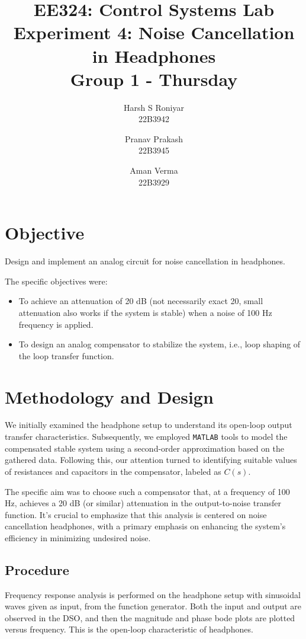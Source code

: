 \documentclass{article}
\title{EE324: Control Systems Lab \\ Experiment 4: Noise Cancellation in Headphones\\ \textbf{Group 1 - Thursday}}
\author{\large Harsh S Roniyar\\ \large 22B3942 \and \large Pranav Prakash\\ \large 22B3945 \and \large Aman Verma\\ \large 22B3929}
\begin{document}
\maketitle

\section{Objective}

Design and implement an analog circuit for noise cancellation in headphones.
\vspace{5pt}

The specific objectives were:
\begin{itemize}[noitemsep]
  \item To achieve an attenuation of 20 dB (not necessarily exact 20, small attenuation also works if the system is stable) when a noise of 100 Hz frequency is applied.
  \item To design an analog compensator to stabilize the system, i.e., loop shaping of the loop transfer function.
\end{itemize}

\section{Methodology and Design}
We initially examined the headphone setup to understand its open-loop output transfer characteristics. Subsequently, we employed \texttt{MATLAB} tools to model the compensated stable system using a second-order approximation based on the gathered data. Following this, our attention turned to identifying suitable values of resistances and capacitors in the compensator, labeled as \(C(s)\).

The specific aim was to choose such a compensator that, at a frequency of 100 Hz, achieves a 20 dB (or similar) attenuation in the output-to-noise transfer function. It's crucial to emphasize that this analysis is centered on noise cancellation headphones, with a primary emphasis on enhancing the system's efficiency in minimizing undesired noise.

\subsection{Procedure}
Frequency response analysis is performed on the headphone setup with sinusoidal waves given as input, from the function generator. Both the input and output are observed in the DSO, and then the magnitude and phase bode plots are plotted versus frequency. This is the open-loop characteristic of headphones.
\end{document}
